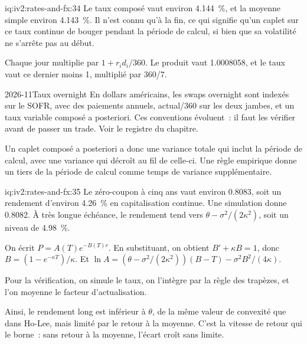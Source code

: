 \begin{solution}{iq:iv2:rates-and-fx:34}
Le taux composé vaut environ 4.144~\%, et la moyenne simple environ 4.143~\%. Il n'est connu qu'à la fin, ce qui signifie qu'un caplet sur ce taux continue de bouger pendant la période de calcul, si bien que sa volatilité ne s'arrête pas au début.

Chaque jour multiplie par $1 + r_id_i/360$. Le produit vaut 1.0008058, et le taux vaut ce dernier moins 1, multiplié par 360/7.

\begin{dated}{2026-11}{Taux overnight}\label{dat:iv2:rates-and-fx:ois}
En dollars américains, les swaps overnight sont indexés sur le SOFR, avec des paiements annuels, actual/360 sur les deux jambes, et un taux variable composé a posteriori. Ces conventions évoluent~: il faut les vérifier avant de passer un trade. Voir le registre du chapitre.
\end{dated}

Un caplet composé a posteriori a donc une variance totale qui inclut la période de calcul, avec une variance qui décroît au fil de celle-ci. Une règle empirique donne un tiers de la période de calcul comme temps de variance supplémentaire.

\end{solution}

\begin{solution}{iq:iv2:rates-and-fx:35}
Le zéro-coupon à cinq ans vaut environ 0.8083, soit un rendement d'environ 4.26~\% en capitalisation continue. Une simulation donne 0.8082. À très longue échéance, le rendement tend vers $\theta - \sigma^2/(2\kappa^2)$, soit un niveau de 4.98~\%.

On écrit $P = A(T)e^{-B(T)r}$. En substituant, on obtient $B' + \kappa B = 1$, donc $B = (1 - e^{-\kappa T})/\kappa$. Et $\ln A = (\theta - \sigma^2/(2\kappa^2))(B - T) - \sigma^2B^2/(4\kappa)$.

Pour la vérification, on simule le taux, on l'intègre par la règle des trapèzes, et l'on moyenne le facteur d'actualisation.

Ainsi, le rendement long est inférieur à $\theta$, de la même valeur de convexité que dans Ho-Lee, mais limité par le retour à la moyenne. C'est la vitesse de retour qui le borne~: sans retour à la moyenne, l'écart croît sans limite.

\end{solution}

